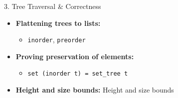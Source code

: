 \documentclass[compress,10pt,xcolor=dvipsnames]{beamer}
\begin{document}
\begin{frame}{3. Tree Traversal & Correctness}

\begin{itemize}
  \item \textbf{Flattening trees to lists:}
    \begin{itemize}
      \item \texttt{inorder}, \texttt{preorder}
    \end{itemize}
  \item \textbf{Proving preservation of elements:}
    \begin{itemize}
      \item \texttt{set (inorder t) = set_tree t}
    \end{itemize}
  \item \textbf{Height and size bounds:} Height and size bounds
\end{itemize}
\end{frame}
\end{document}
